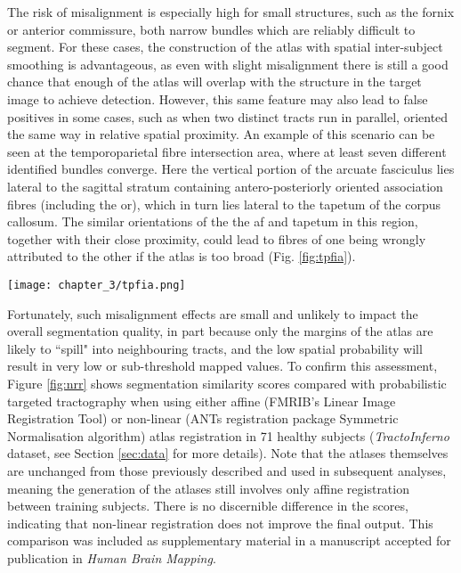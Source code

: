 The risk of misalignment is especially high for small structures, such as the fornix or anterior commissure, both narrow bundles which are reliably difficult to segment.
For these cases, the construction of the atlas with spatial inter-subject smoothing is advantageous, as even with slight misalignment there is still a good chance that enough of the atlas will overlap with the structure in the target image to achieve detection.
However, this same feature may also lead to false positives in some cases, such as when two distinct tracts run in parallel, oriented the same way in relative spatial proximity.
An example of this scenario can be seen at the temporoparietal fibre intersection area, where at least seven different identified bundles converge.\autocite{Martino2013b}
Here the vertical portion of the arcuate fasciculus lies lateral to the sagittal stratum containing antero-posteriorly oriented association fibres (including the \gls{or}), which in turn lies lateral to the tapetum of the corpus callosum.
The similar orientations of the the \gls{af} and tapetum in this region, together with their close proximity, could lead to fibres of one being wrongly attributed to the other if the atlas is too broad (Fig. \ref{fig:tpfia}).

\begin{SCfigure}[][h!]
  \captionsetup{format=plain}
  \texttt{[image: chapter\_3/tpfia.png]}
  \caption{Example of potential for atlas misalignment. The \gls{af} (*) and tapetum (**) are proximal and parallel at the temporoparietal fibre intersection area. Linearly registered right \gls{af} atlas \glspl{tod} may overlap with tapetum (arrow).}
  \label{fig:tpfia}
\end{SCfigure}

Fortunately, such misalignment effects are small and unlikely to impact the overall segmentation quality, in part because only the margins of the atlas are likely to ``spill" into neighbouring tracts, and the low spatial probability will result in very low or sub-threshold mapped values.
To confirm this assessment, Figure \ref{fig:nrr} shows segmentation similarity scores compared with probabilistic targeted tractography when using either affine (FMRIB's Linear Image Registration Tool\autocite{Jenkinson2002}) or non-linear (ANTs registration package Symmetric Normalisation algorithm\autocite{Tustison2013,Avants2011}) atlas registration in 71 healthy subjects (\textit{TractoInferno} dataset, see Section \ref{sec:data} for more details).
Note that the atlases themselves are unchanged from those previously described and used in subsequent analyses, meaning the generation of the atlases still involves only affine registration between training subjects.
There is no discernible difference in the scores, indicating that non-linear registration does not improve the final output.
This comparison was included as supplementary material in a manuscript accepted for publication in \textit{Human Brain Mapping}\autocite{Young2024}.

